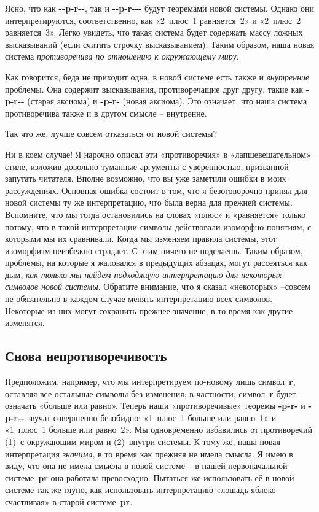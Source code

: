 \documentclass[../main.tex]{subfiles}
\begin{document}
Ясно, что как \textbf{-{}-p-r-{}-}, так и \textbf{-{}-p-r-{}-{}-} будут теоремами новой системы. Однако они интерпретируются, соответственно, как «2~плюс~1 равняется~2» и «2~плюс~2 равняется~3». Легко увидеть, что такая система будет содержать массу ложных высказываний (если считать строчку высказыванием). Таким образом, наша новая система \emph{противоречива по отношению к окружающему миру}.

Как говорится, беда не приходит одна, в новой системе есть также и \emph{внутренние} проблемы. Она содержит высказывания, противоречащие друг другу, такие как \textbf{-p-r-{}-} (старая аксиома) и \textbf{-p-r-} (новая аксиома). Это означает, что наша система противоречива также и в другом смысле \--- внутренне.

Так что же, лучше совсем отказаться от новой системы?

Ни в коем случае! Я нарочно описал эти «противоречия» в «лапшевешательном» стиле, изложив довольно туманные аргументы с уверенностью, призванной запутать читателя. Вполне возможно, что вы уже заметили ошибки в моих рассуждениях. Основная ошибка состоит в том, что я безоговорочно принял для новой системы ту же интерпретацию, что была верна для прежней системы. Вспомните, что мы тогда остановились на словах «плюс» и «равняется» только потому, что в такой интерпретации символы действовали изоморфно понятиям, с которыми мы их сравнивали. Когда мы изменяем правила системы, этот изоморфизм неизбежно страдает. С этим ничего не поделаешь. Таким образом, проблемы, на которые я жаловался в предыдущих абзацах, могут рассеяться как дым, \emph{как только мы найдем подходящую интерпретацию для некоторых символов новой системы}. Обратите внимание, что я сказал «некоторых» \---совсем не обязательно в каждом случае менять интерпретацию всех символов. Некоторые из них могут сохранить прежнее значение, в то время как другие изменятся.


\subsection{Снова непротиворечивость}

Предположим, например, что мы интерпретируем по-новому лишь символ~\textbf{r}, оставляя все остальные символы без изменения; в частности, символ~\textbf{r} будет означать «больше или равно». Теперь наши «противоречивые» теоремы \textbf{-p-r-} и \textbf{-p-r-{}-} звучат совершенно безобидно: «1~плюс~1 больше или равно~1» и «1~плюс~1 больше или равно~2». Мы одновременно избавились от противоречий (1)~с окружающим миром и (2)~внутри системы. К тому же, наша новая интерпретация \emph{значима}, в то время как прежняя не имела смысла. Я имею в виду, что она не имела смысла в новой системе \--- в нашей первоначальной системе~\textbf{pr} она работала превосходно. Пытаться же использовать её в новой системе так же глупо, как использовать интерпретацию «лошадь-яблоко-счастливая» в старой системе~\textbf{pr}.
\end{document}
